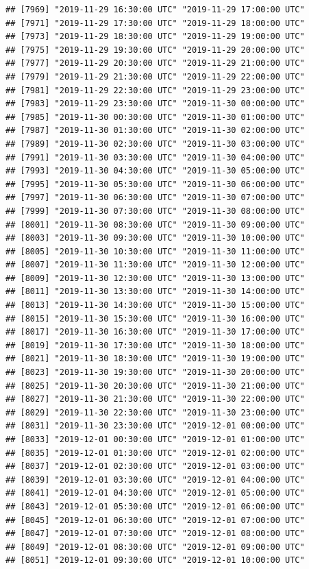 \documentclass{article}\usepackage[]{graphicx}\usepackage[]{color}
\makeatletter
\newenvironment{kframe}{%
 \def\at@end@of@kframe{}%
 \ifinner\ifhmode%
  \def\at@end@of@kframe{\end{minipage}}%
  \begin{minipage}{\columnwidth}%
 \fi\fi%
 \def\FrameCommand##1{\hskip\@totalleftmargin \hskip-\fboxsep
 \colorbox{shadecolor}{##1}\hskip-\fboxsep
     \hskip-\linewidth \hskip-\@totalleftmargin \hskip\columnwidth}%
 \MakeFramed {\advance\hsize-\width
   \@totalleftmargin\z@ \linewidth\hsize
   \@setminipage}}%
 {\par\unskip\endMakeFramed%
 \at@end@of@kframe}
\newenvironment{knitrout}{}{} %
\makeatother
\begin{document}
\begin{knitrout}
\begin{kframe}
\begin{verbatim}
## [7969] "2019-11-29 16:30:00 UTC" "2019-11-29 17:00:00 UTC"
## [7971] "2019-11-29 17:30:00 UTC" "2019-11-29 18:00:00 UTC"
## [7973] "2019-11-29 18:30:00 UTC" "2019-11-29 19:00:00 UTC"
## [7975] "2019-11-29 19:30:00 UTC" "2019-11-29 20:00:00 UTC"
## [7977] "2019-11-29 20:30:00 UTC" "2019-11-29 21:00:00 UTC"
## [7979] "2019-11-29 21:30:00 UTC" "2019-11-29 22:00:00 UTC"
## [7981] "2019-11-29 22:30:00 UTC" "2019-11-29 23:00:00 UTC"
## [7983] "2019-11-29 23:30:00 UTC" "2019-11-30 00:00:00 UTC"
## [7985] "2019-11-30 00:30:00 UTC" "2019-11-30 01:00:00 UTC"
## [7987] "2019-11-30 01:30:00 UTC" "2019-11-30 02:00:00 UTC"
## [7989] "2019-11-30 02:30:00 UTC" "2019-11-30 03:00:00 UTC"
## [7991] "2019-11-30 03:30:00 UTC" "2019-11-30 04:00:00 UTC"
## [7993] "2019-11-30 04:30:00 UTC" "2019-11-30 05:00:00 UTC"
## [7995] "2019-11-30 05:30:00 UTC" "2019-11-30 06:00:00 UTC"
## [7997] "2019-11-30 06:30:00 UTC" "2019-11-30 07:00:00 UTC"
## [7999] "2019-11-30 07:30:00 UTC" "2019-11-30 08:00:00 UTC"
## [8001] "2019-11-30 08:30:00 UTC" "2019-11-30 09:00:00 UTC"
## [8003] "2019-11-30 09:30:00 UTC" "2019-11-30 10:00:00 UTC"
## [8005] "2019-11-30 10:30:00 UTC" "2019-11-30 11:00:00 UTC"
## [8007] "2019-11-30 11:30:00 UTC" "2019-11-30 12:00:00 UTC"
## [8009] "2019-11-30 12:30:00 UTC" "2019-11-30 13:00:00 UTC"
## [8011] "2019-11-30 13:30:00 UTC" "2019-11-30 14:00:00 UTC"
## [8013] "2019-11-30 14:30:00 UTC" "2019-11-30 15:00:00 UTC"
## [8015] "2019-11-30 15:30:00 UTC" "2019-11-30 16:00:00 UTC"
## [8017] "2019-11-30 16:30:00 UTC" "2019-11-30 17:00:00 UTC"
## [8019] "2019-11-30 17:30:00 UTC" "2019-11-30 18:00:00 UTC"
## [8021] "2019-11-30 18:30:00 UTC" "2019-11-30 19:00:00 UTC"
## [8023] "2019-11-30 19:30:00 UTC" "2019-11-30 20:00:00 UTC"
## [8025] "2019-11-30 20:30:00 UTC" "2019-11-30 21:00:00 UTC"
## [8027] "2019-11-30 21:30:00 UTC" "2019-11-30 22:00:00 UTC"
## [8029] "2019-11-30 22:30:00 UTC" "2019-11-30 23:00:00 UTC"
## [8031] "2019-11-30 23:30:00 UTC" "2019-12-01 00:00:00 UTC"
## [8033] "2019-12-01 00:30:00 UTC" "2019-12-01 01:00:00 UTC"
## [8035] "2019-12-01 01:30:00 UTC" "2019-12-01 02:00:00 UTC"
## [8037] "2019-12-01 02:30:00 UTC" "2019-12-01 03:00:00 UTC"
## [8039] "2019-12-01 03:30:00 UTC" "2019-12-01 04:00:00 UTC"
## [8041] "2019-12-01 04:30:00 UTC" "2019-12-01 05:00:00 UTC"
## [8043] "2019-12-01 05:30:00 UTC" "2019-12-01 06:00:00 UTC"
## [8045] "2019-12-01 06:30:00 UTC" "2019-12-01 07:00:00 UTC"
## [8047] "2019-12-01 07:30:00 UTC" "2019-12-01 08:00:00 UTC"
## [8049] "2019-12-01 08:30:00 UTC" "2019-12-01 09:00:00 UTC"
## [8051] "2019-12-01 09:30:00 UTC" "2019-12-01 10:00:00 UTC"

\end{verbatim}
\end{kframe}
\end{knitrout}
\end{document}
